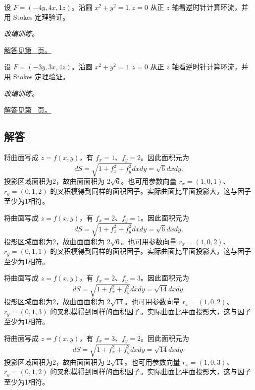 \documentclass[UTF8,12pt,a4paper,fontset=fandol]{ctexart}
\begin{document}
\begin{example}\label{ex:c43q23}
设 $F=(-4y,4x,1z)$。沿圆 $x^2+y^2=1,z=0$ 从正 $z$ 轴看逆时针计算环流，并用 Stokes 定理验证。
\par\textit{改编训练。}\par\hyperref[ans:c43q23]{解答见第~\pageref{ans:c43q23} 页。}
\end{example}
\begin{example}\label{ex:c43q24}
设 $F=(-3y,3x,4z)$。沿圆 $x^2+y^2=1,z=0$ 从正 $z$ 轴看逆时针计算环流，并用 Stokes 定理验证。
\par\textit{改编训练。}\par\hyperref[ans:c43q24]{解答见第~\pageref{ans:c43q24} 页。}
\end{example}
\subsection{解答}
\begin{solve}\label{ans:c43q1}
将曲面写成 $z=f(x,y)$，有 $f_x=1$、$f_y=2$。因此面积元为
\[
dS=\sqrt{1+f_x^2+f_y^2}dxdy=\sqrt{6}dxdy.
\]
投影区域面积为2，故曲面面积为 $2\sqrt{6}$。也可用参数向量 $r_x=(1,0,1)$、$r_y=(0,1,2)$ 的叉积模得到同样的面积因子。实际曲面比平面投影大，这与因子至少为1相符。
\end{solve}

\begin{solve}\label{ans:c43q2}
将曲面写成 $z=f(x,y)$，有 $f_x=2$、$f_y=1$。因此面积元为
\[
dS=\sqrt{1+f_x^2+f_y^2}dxdy=\sqrt{6}dxdy.
\]
投影区域面积为2，故曲面面积为 $2\sqrt{6}$。也可用参数向量 $r_x=(1,0,2)$、$r_y=(0,1,1)$ 的叉积模得到同样的面积因子。实际曲面比平面投影大，这与因子至少为1相符。
\end{solve}

\begin{solve}\label{ans:c43q3}
将曲面写成 $z=f(x,y)$，有 $f_x=2$、$f_y=3$。因此面积元为
\[
dS=\sqrt{1+f_x^2+f_y^2}dxdy=\sqrt{14}dxdy.
\]
投影区域面积为2，故曲面面积为 $2\sqrt{14}$。也可用参数向量 $r_x=(1,0,2)$、$r_y=(0,1,3)$ 的叉积模得到同样的面积因子。实际曲面比平面投影大，这与因子至少为1相符。
\end{solve}

\begin{solve}\label{ans:c43q4}
将曲面写成 $z=f(x,y)$，有 $f_x=3$、$f_y=2$。因此面积元为
\[
dS=\sqrt{1+f_x^2+f_y^2}dxdy=\sqrt{14}dxdy.
\]
投影区域面积为2，故曲面面积为 $2\sqrt{14}$。也可用参数向量 $r_x=(1,0,3)$、$r_y=(0,1,2)$ 的叉积模得到同样的面积因子。实际曲面比平面投影大，这与因子至少为1相符。
\end{solve}
\end{document}
